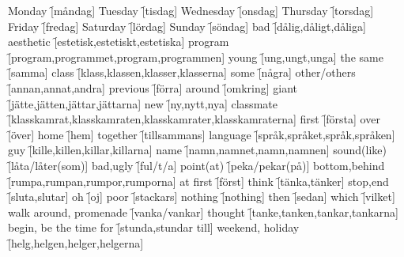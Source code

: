 \begin{questions}
    \begin{multicols}{2}
        \raggedcolumns
        \question Monday \f[måndag]
        \question Tuesday \f[tisdag]
        \question Wednesday \f[onsdag]
        \question Thursday \f[torsdag]
        \question Friday \f[fredag]
        \question Saturday \f[lördag]
        \question Sunday \f[söndag]
        \question bad \f[dålig,dåligt,dåliga]
        \question aesthetic \f[estetisk,estetiskt,estetiska]
        \question program \f[program,programmet,program,programmen]
        \question young \f[ung,ungt,unga]
        \question the same \f[samma]
        \question class \f[klass,klassen,klasser,klasserna]
        \question some \f[några]
        \question other/others \f[annan,annat,andra]
        \question previous \f[förra]
        \question around \f[omkring]
        \question giant \f[jätte,jätten,jättar,jättarna]
        \question new \f[ny,nytt,nya]
        \question classmate \f[klasskamrat,klasskamraten,klasskamrater,klasskamraterna]
        \question first \f[första]
        \question over \f[över]
        \question home \f[hem]
        \question together \f[tillsammans]
        \question language \f[språk,språket,språk,språken]
        \question guy \f[kille,killen,killar,killarna]
        \question name \f[namn,namnet,namn,namnen]
        \question sound(like) \f[låta/låter(som)]
        \question bad,ugly \f[ful/t/a]
        \question point(at) \f[peka/pekar(på)]
        \question bottom,behind \f[rumpa,rumpan,rumpor,rumporna]
        \question at first \f[först]
        \question think \f[tänka,tänker]
        \question stop,end \f[sluta,slutar]
        \question oh \f[oj]
        \question poor \f[stackars]
        \question nothing \f[nothing]
        \question then \f[sedan]
        \question which \f[vilket]
        \question walk around, promenade \f[vanka/vankar]
        \question thought \f[tanke,tanken,tankar,tankarna]
        \question begin, be the time for \f[stunda,stundar till]
        \question weekend, holiday  \f[helg,helgen,helger,helgerna]
    \end{multicols}
\end{questions}